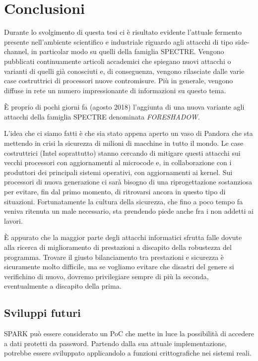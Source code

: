 \chapter{Conclusioni}
	Durante lo svolgimento di questa tesi ci è risultato evidente l'attuale fermento presente nell'ambiente scientifico e industriale riguardo agli attacchi di tipo side-channel, in particolar modo su quelli della famiglia SPECTRE. Vengono pubblicati continuamente articoli accademici che spiegano nuovi attacchi o varianti di quelli già conosciuti e, di conseguenza, vengono rilasciate dalle varie case costruttrici di processori nuove contromisure. Più in generale, vengono diffuse in rete un numero impressionante di informazioni su questo tema.
	
	\`{E} proprio di pochi giorni fa (agosto 2018) l'aggiunta di una nuova variante agli attacchi della famiglia SPECTRE denominata \emph{FORESHADOW}\cite{bulck2018foreshadow}.
	
	L'idea che ci siamo fatti è che sia stato appena aperto un vaso di Pandora che sta mettendo in crisi la sicurezza di milioni di macchine in tutto il mondo. Le case costruttrici (Intel soprattutto) stanno cercando di mitigare questi attacchi sui vecchi processori con aggiornamenti al microcode e, in collaborazione con i produttori dei principali sistemi operativi, con aggiornamenti ai kernel. Sui processori di nuova generazione ci sarà bisogno di una riprogettazione sostanziosa per evitare, fin dal primo momento, di ritrovarsi ancora in questo tipo di situazioni. Fortunatamente la cultura della sicurezza, che fino a poco tempo fa veniva ritenuta un male necessario, sta prendendo piede anche fra i non addetti ai lavori. 
	
	\`{E} appurato che la maggior parte degli attacchi informatici sfrutta falle dovute alla ricerca di miglioramento di prestazioni a discapito della robustezza del programma. Trovare il giusto bilanciamento tra prestazioni e sicurezza è sicuramente molto difficile, ma se vogliamo evitare che disastri del genere si verifichino di nuovo, dovremo privilegiare sempre di più la seconda, eventualmente a discapito della prima.
	
	\section{Sviluppi futuri}
		SPARK può essere considerato un \ac{PoC} che mette in luce la possibilità di accedere a dati protetti da password. Partendo dalla sua attuale implementazione, potrebbe essere sviluppato applicandolo a funzioni crittografiche nei sistemi reali. 
		
